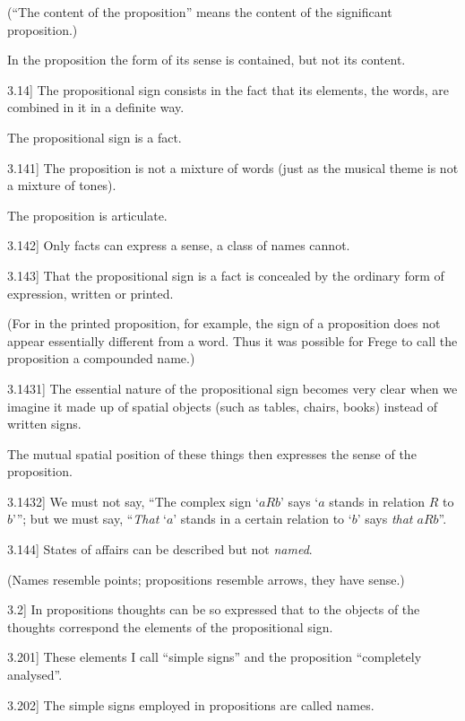 \documentclass[12pt,oneside]{book}[2007/10/19]
\newcommand{\PropositionE}[2]{%
  \item[\phantomsection\label{PropE:#1}\PropGRef{#1}] #2%
}
\newcommand{\PropGRef}[1]{\hyperref[PropG:#1]{#1}}
\begin{document}
\begin{propositions}
{(``The content of the proposition'' means the
content of the significant proposition.)

In the proposition the form of its sense is
\enlargethispage{15pt} %
contained, but not its content.}


\PropositionE{3.14}
{The propositional sign consists in the fact that
its elements, the words, are combined in it in a
definite way.

The propositional sign is a fact.}


\PropositionE{3.141}
{The proposition is not a mixture of words
(just as the musical theme is not a mixture of
tones).

The proposition is articulate.}


\PropositionE{3.142}
{Only facts can express a sense, a class of names
cannot.}


\PropositionE{3.143}
{That the propositional sign is a fact is concealed
by the ordinary form of expression, written or
printed.

(For in the printed proposition, for example, the
sign of a proposition does not appear essentially
different from a word. Thus it was possible for
Frege to call the proposition a compounded
name.)}


\PropositionE{3.1431}
{The essential nature of the propositional sign
becomes very clear when we imagine it made up
of spatial objects (such as tables, chairs, books)
instead of written signs.

The mutual spatial position of these things then
expresses the sense of the proposition.}


\PropositionE{3.1432}
{We must not say, ``The complex sign `$aRb$'
says `$a$ stands in relation $R$ to $b$'{}''; but we must
say, ``\emph{That} `$a$' stands in a certain relation to `$b$'
says \emph{that $aRb$}''.}


\PropositionE{3.144}
{States of affairs can be described but not
\emph{named}.

(Names resemble points; propositions resemble
arrows, they have sense.)}


\PropositionE{3.2}
{In propositions thoughts can be so expressed
that to the objects of the thoughts correspond the
elements of the propositional sign.}


\PropositionE{3.201}
{These elements I call ``simple signs'' and the
proposition ``completely analysed''.}


\PropositionE{3.202}
{The simple signs employed in propositions are
called names.}



\end{propositions}
\end{document}
